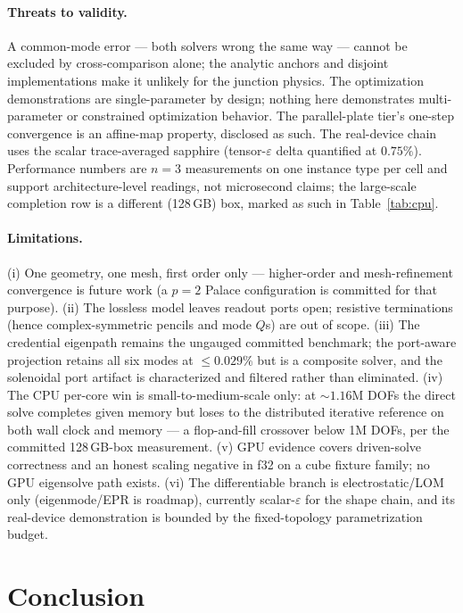 \documentclass{anvil-paper}
\begin{document}
\paragraph{Threats to validity.}
A common-mode error --- both solvers wrong the same way --- cannot be
excluded by cross-comparison alone; the analytic anchors and disjoint
implementations make it unlikely for the junction physics. The
optimization demonstrations are single-parameter by design; nothing here
demonstrates multi-parameter or constrained optimization behavior. The
parallel-plate tier's one-step convergence is an affine-map property,
disclosed as such. The real-device chain uses the scalar trace-averaged
sapphire (tensor-$\varepsilon$ delta quantified at $0.75\%$).
Performance numbers are $n=3$ measurements on one instance type per
cell and support architecture-level readings, not microsecond claims;
the large-scale completion row is a different (128\,GB) box, marked as
such in Table~\ref{tab:cpu}.

\paragraph{Limitations.}
(i) One geometry, one mesh, first order only --- higher-order and
mesh-refinement convergence is future work (a $p = 2$ Palace
configuration is committed for that purpose). (ii) The lossless model
leaves readout ports open; resistive terminations (hence
complex-symmetric pencils and mode $Q$s) are out of scope. (iii) The
credential eigenpath remains the ungauged committed benchmark; the
port-aware projection retains all six modes at $\leq 0.029\%$ but is a
composite solver, and the solenoidal port artifact is characterized and
filtered rather than eliminated. (iv) The CPU per-core win is
small-to-medium-scale only: at ${\sim}1.16$M DOFs the direct solve
completes given memory but loses to the distributed iterative reference
on both wall clock and memory --- a flop-and-fill crossover below 1M
DOFs, per the committed 128\,GB-box measurement. (v) GPU evidence covers
driven-solve correctness and an honest scaling negative in f32 on a
cube fixture family; no GPU eigensolve path exists. (vi) The
differentiable branch is electrostatic/LOM only (eigenmode/EPR is
roadmap), currently scalar-$\varepsilon$ for the shape chain, and its
real-device demonstration is bounded by the fixed-topology
parametrization budget.

\section{Conclusion}
\label{sec:conclusion}
\end{document}
